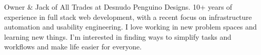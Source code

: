 

\begin{cvparagraph}

    Owner \& Jack of All Trades at Desnudo Penguino Designs. 10+ years of experience in full stack web development, with a recent focus on infrastructure automation and usability engineering. I love working in new problem spaces and learning new things. I'm interested in finding ways to simplify tasks and workflows and make life easier for everyone.
\end{cvparagraph}
